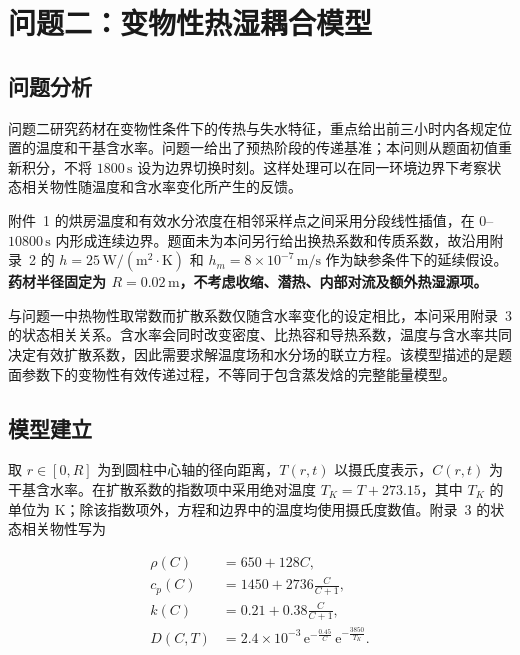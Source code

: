 \section{问题二：变物性热湿耦合模型}

\subsection{问题分析}

问题二研究药材在变物性条件下的传热与失水特征，重点给出前三小时内各规定位置的温度和干基含水率。问题一给出了预热阶段的传递基准；本问则从题面初值重新积分，不将 $1800\,\mathrm{s}$ 设为边界切换时刻。这样处理可以在同一环境边界下考察状态相关物性随温度和含水率变化所产生的反馈。

附件~1 的烘房温度和有效水分浓度在相邻采样点之间采用分段线性插值，在 $0$--$10800\,\mathrm{s}$ 内形成连续边界。题面未为本问另行给出换热系数和传质系数，故沿用附录~2 的 $h=25\,\mathrm{W/(m^2\cdot K)}$ 和 $h_m=8\times10^{-7}\,\mathrm{m/s}$ 作为缺参条件下的延续假设。{\heiti\bfseries 药材半径固定为 $R=0.02\,\mathrm{m}$，不考虑收缩、潜热、内部对流及额外热湿源项。}

与问题一中热物性取常数而扩散系数仅随含水率变化的设定相比，本问采用附录~3 的状态相关关系。含水率会同时改变密度、比热容和导热系数，温度与含水率共同决定有效扩散系数，因此需要求解温度场和水分场的联立方程。该模型描述的是题面参数下的变物性有效传递过程，不等同于包含蒸发焓的完整能量模型。

\subsection{模型建立}

取 $r\in[0,R]$ 为到圆柱中心轴的径向距离，$T(r,t)$ 以摄氏度表示，$C(r,t)$ 为干基含水率。在扩散系数的指数项中采用绝对温度 $T_K=T+273.15$，其中 $T_K$ 的单位为 K；除该指数项外，方程和边界中的温度均使用摄氏度数值。附录~3 的状态相关物性写为

\begin{equation}
\begin{aligned}
  \rho(C)&=650+128C,\\[2pt]
  c_p(C)&=1450+2736\frac{C}{C+1},\\[2pt]
  k(C)&=0.21+0.38\frac{C}{C+1},\\[2pt]
  D(C,T)&=2.4\times10^{-3}
  \,\mathrm e^{-\frac{0.45}{C}}
  \,\mathrm e^{-\frac{3850}{T_K}}.
\end{aligned}
\label{eq:q2-properties}
\end{equation}

